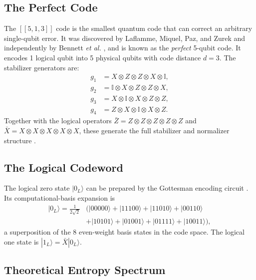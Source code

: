 \documentclass[12pt,a4paper,oneside]{book}
\theoremstyle{plain}
\theoremstyle{definition}
\theoremstyle{remark}
\begin{document}
\subsection{The Perfect Code}

The $[[5,1,3]]$ code is the smallest quantum code that can correct an arbitrary single-qubit error. It was discovered by Laflamme, Miquel, Paz, and Zurek \cite{laflamme1996perfect} and independently by Bennett \textit{et al.} \cite{bennett1996mixed}, and is known as the \emph{perfect} 5-qubit code. It encodes 1 logical qubit into 5 physical qubits with code distance $d = 3$. The stabilizer generators are:
\begin{align}
    g_1 &= X \otimes Z \otimes Z \otimes X \otimes \mathbb{I}, \nonumber\\
    g_2 &= \mathbb{I} \otimes X \otimes Z \otimes Z \otimes X, \nonumber\\
    g_3 &= X \otimes \mathbb{I} \otimes X \otimes Z \otimes Z, \nonumber\\
    g_4 &= Z \otimes X \otimes \mathbb{I} \otimes X \otimes Z. \label{eq:stabilizers}
\end{align}
Together with the logical operators $\bar{Z} = Z \otimes Z \otimes Z \otimes Z \otimes Z$ and $\bar{X} = X \otimes X \otimes X \otimes X \otimes X$, these generate the full stabilizer and normalizer structure \cite{gottesman1997stabilizer}.

\subsection{The Logical Codeword}

The logical zero state $|0_L\rangle$ can be prepared by the Gottesman encoding circuit \cite{gottesman1997stabilizer}. Its computational-basis expansion is
\begin{align}
    |0_L\rangle = \tfrac{1}{2\sqrt{2}}&\bigl(|00000\rangle + |11100\rangle + |11010\rangle + |00110\rangle \nonumber\\
    &+ |10101\rangle + |01001\rangle + |01111\rangle + |10011\rangle\bigr),
\end{align}
a superposition of the 8 even-weight basis states in the code space. The logical one state is $|1_L\rangle = \bar{X}|0_L\rangle$.

\subsection{Theoretical Entropy Spectrum}
\end{document}
